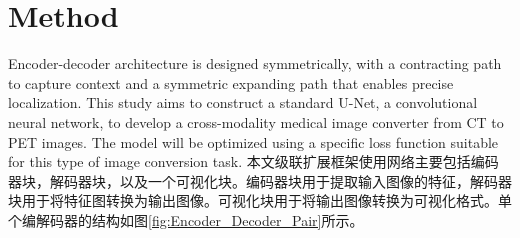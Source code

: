 \documentclass[twocolumn]{article}
\begin{document}



\section{Method}
Encoder-decoder architecture is designed symmetrically, with a contracting path to capture context and a symmetric expanding path that enables precise localization. This study aims to construct a standard U-Net, a convolutional neural network, to develop a cross-modality medical image converter from CT to PET images. The model will be optimized using a specific loss function suitable for this type of image conversion task.
本文级联扩展框架使用网络主要包括编码器块，解码器块，以及一个可视化块。编码器块用于提取输入图像的特征，解码器块用于将特征图转换为输出图像。可视化块用于将输出图像转换为可视化格式。单个编解码器的结构如图\ref{fig:Encoder_Decoder_Pair}所示。
\end{document}
